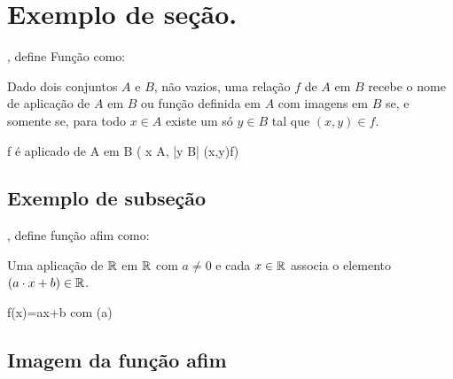 \section{Exemplo de seção.}
\label{sec:introfunc}

, define Função como: 

\begin{definicao} 
Dado dois conjuntos $A$ e $B$, não vazios, uma relação $f$ de $A$ em $B$ recebe o nome de aplicação de $A$ em $B$ ou função definida em $A$ com imagens em $B$ se, e somente se, para todo $x\in A$ existe um só $y\in B$ tal que $(x,y)\in f$.

\bb
f\hspace{0.2cm} é\hspace{0.2cm} aplicado\hspace{0.2cm} de\hspace{0.2cm} A\hspace{0.2cm} em\hspace{0.2cm} B\hspace{0.2cm} \Longleftrightarrow (\forall \hspace{0.2cm} x \in A,\hspace{0.2cm} \exists \hspace{0.2cm} |y \in B|\hspace{0.2cm} (x,y)\in f) 
\ee

\end{definicao}


\subsection{Exemplo de subseção}
 , define função afim como:
 
 \begin{definicao}
 
  Uma aplicação de $\mathbb{R}$ em $\mathbb{R}$ com $a\neq 0$ e cada $x\in \mathbb{R}$ associa o elemento $(a\cdot x + b)\in \mathbb{R}$.

\bb
f(x)=a\cdot x+b\hspace{0.5cm} com \hspace{0.5cm}  (a)
\ee

\end{definicao}
 
\subsection{Imagem da função afim}

